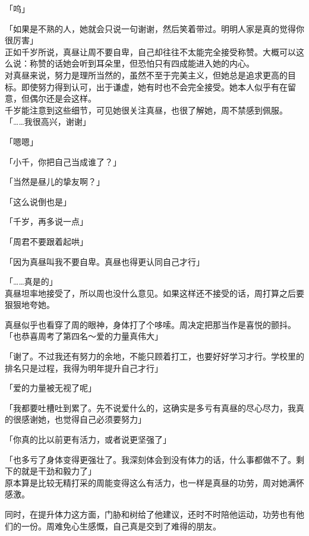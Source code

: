「呜」

「如果是不熟的人，她就会只说一句谢谢，然后笑着带过。明明人家是真的觉得你很厉害」\\

正如千岁所说，真昼让周不要自卑，自己却往往不太能完全接受称赞。大概可以这么说：称赞的话她会听到耳朵里，但恐怕只有四成能进入她的内心。\\

对真昼来说，努力是理所当然的，虽然不至于完美主义，但她总是追求更高的目标。即使努力得到认可，出于谦虚，她有时也不会完全接受。她本人似乎有在留意，但偶尔还是会这样。\\

千岁能注意到这些细节，可见她很关注真昼，也很了解她，周不禁感到佩服。\\

「……我很高兴，谢谢」

「嗯嗯」

「小千，你把自己当成谁了？」

「当然是昼儿的挚友啊？」

「这么说倒也是」

「千岁，再多说一点」

「周君不要跟着起哄」

「因为真昼叫我不要自卑。真昼也得更认同自己才行」

「……真是的」\\

真昼坦率地接受了，所以周也没什么意见。如果这样还不接受的话，周打算之后要狠狠地夸她。

真昼似乎也看穿了周的眼神，身体打了个哆嗦。周决定把那当作是喜悦的颤抖。\\

「也恭喜周考了第四名～爱的力量真伟大」

「谢了。不过我还有努力的余地，不能只顾着打工，也要好好学习才行。学校里的排名只是过程，我得为明年提升自己才行」

「爱的力量被无视了呢」

「我都要吐槽吐到累了。先不说爱什么的，这确实是多亏有真昼的尽心尽力，我真的很感谢她，也觉得自己必须要努力」

「你真的比以前更有活力，或者说更坚强了」

「也多亏了身体变得更强壮了。我深刻体会到没有体力的话，什么事都做不了。剩下的就是干劲和毅力了」\\

原本算是比较无精打采的周能变得这么有活力，也一样是真昼的功劳，周对她满怀感激。

同时，在提升体力这方面，门胁和树给了他建议，还时不时陪他运动，功劳也有他们的一份。周难免心生感慨，自己真是交到了难得的朋友。

